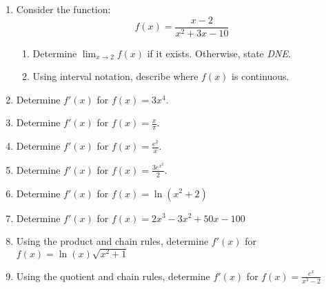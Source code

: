 \documentclass[letterpaper,12pt,fleqn]{article}
\begin{document}
\begin{enumerate}[left=0pt]
\item Consider the function:
  \[f(x)=\frac{x-2}{x^2+3x-10}\]
  \begin{enumerate}
  \item Determine \(\displaystyle\lim_{x\to2}f(x)\) if it exists.  Otherwise, state \emph{DNE}.

    \vspace{2.5in}

  \item Using interval notation, describe where \(f(x)\) is continuous.
  \end{enumerate}

  \newpage

\item Determine \(f'(x)\) for \(f(x)=3x^4\).

  \vspace{1in}

\item Determine \(f'(x)\) for \(\displaystyle f(x)=\frac{x}{\pi}\).

  \vspace{1in}

\item Determine \(f'(x)\) for \(\displaystyle f(x)=\frac{e^2}{x}\).

  \vspace{1in}

\item Determine \(f'(x)\) for \(\displaystyle f(x)=\frac{3e^{x^2}}{2}\).

  \vspace{1in}

\item Determine \(f'(x)\) for \(f(x)=\ln(x^2+2)\)

  \vspace{1in}

\item Determine \(f'(x)\) for \(f(x)=2x^3-3x^2+50x-100\)

  \newpage

\item Using the product and chain rules, determine \(f'(x)\) for \(f(x)=\ln(x)\sqrt{x^2+1}\)

  \vspace{4in}

\item Using the quotient and chain rules, determine \(f'(x)\) for \(f(x)=\frac{e^x}{x^3-2}\)

  \newpage


\end{enumerate}
\end{document}

